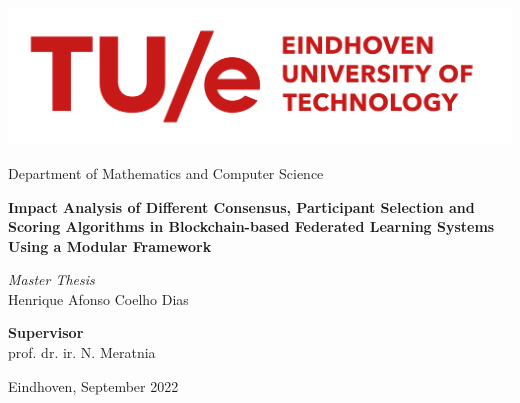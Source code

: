 \begin{titlepage}
\centering
\includegraphics[width=0.7\linewidth]{graphics/tue-logo.png}\par
Department of Mathematics and Computer Science

\vspace{3cm}

{\sffamily\LARGE\textbf{
Impact Analysis of Different Consensus, Participant Selection and Scoring Algorithms in Blockchain-based Federated Learning Systems Using a Modular Framework}}

\par\vspace{2cm}
{\large\textit{Master Thesis}}\\
\vspace{0.2cm}
{\large Henrique Afonso Coelho Dias}

\vspace{2cm}

\textbf{Supervisor} \\
\vspace{0.1cm}
prof. dr. ir. N. Meratnia

\par


\vfill

{Eindhoven, September 2022}

\end{titlepage}